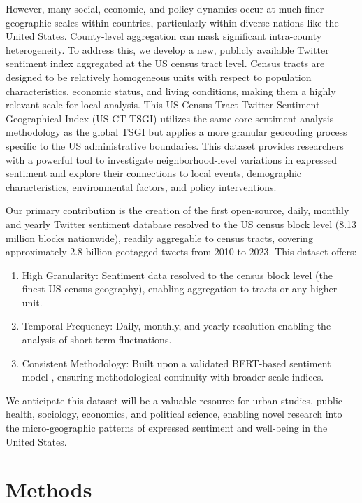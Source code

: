 \documentclass[fleqn,10pt]{wlscirep}
\begin{document}
However, many social, economic, and policy dynamics occur at much finer geographic scales within countries, particularly within diverse nations like the United States. County-level aggregation can mask significant intra-county heterogeneity. To address this, we develop a new, publicly available Twitter sentiment index aggregated at the US census tract level. Census tracts are designed to be relatively homogeneous units with respect to population characteristics, economic status, and living conditions, making them a highly relevant scale for local analysis. This US Census Tract Twitter Sentiment Geographical Index (US-CT-TSGI) utilizes the same core sentiment analysis methodology as the global TSGI but applies a more granular geocoding process specific to the US administrative boundaries. This dataset provides researchers with a powerful tool to investigate neighborhood-level variations in expressed sentiment and explore their connections to local events, demographic characteristics, environmental factors, and policy interventions.

Our primary contribution is the creation of the first open-source, daily, monthly and yearly Twitter sentiment database resolved to the US census block level (8.13 million blocks nationwide), readily aggregable to census tracts, covering approximately 2.8 billion geotagged tweets from 2010 to 2023. This dataset offers:

\begin{enumerate}
    \item High Granularity: Sentiment data resolved to the census block level (the finest US census geography), enabling aggregation to tracts or any higher unit.
    \item Temporal Frequency: Daily, monthly, and yearly resolution enabling the analysis of short-term fluctuations.
    \item Consistent Methodology: Built upon a validated BERT-based sentiment model \cite{chaiTwitterSentimentGeographical2023a}, ensuring methodological continuity with broader-scale indices.
\end{enumerate}

We anticipate this dataset will be a valuable resource for urban studies, public health, sociology, economics, and political science, enabling novel research into the micro-geographic patterns of expressed sentiment and well-being in the United States.


\section*{Methods}
\end{document}
